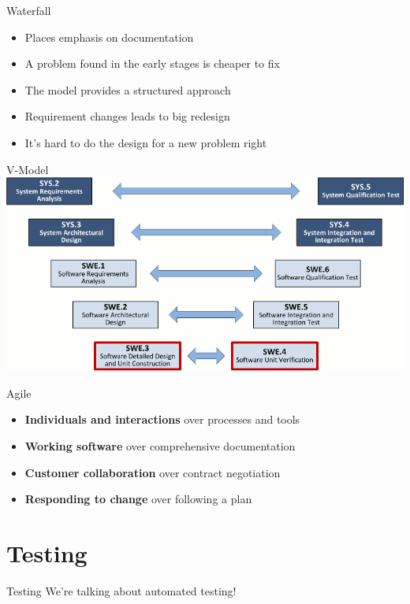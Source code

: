 \documentclass{beamer}
\begin{document}
\begin{frame}{Waterfall}
\begin{itemize}
  \item Places emphasis on documentation
  \item A problem found in the early stages is cheaper to fix
  \item The model provides a structured approach
  \item Requirement changes leads to big redesign
  \item It's hard to do the design for a new problem right
\end{itemize}
\end{frame}

\begin{frame}{V-Model}
\includegraphics[scale=0.4]{img/VModel.png}
\end{frame}

\begin{frame}{Agile}
\begin{itemize}
  \item \textbf{Individuals and interactions} over processes and tools 
  \item \textbf{Working software} over comprehensive documentation
  \item \textbf{Customer collaboration} over contract negotiation
  \item \textbf{Responding to change} over following a plan
\end{itemize}
\end{frame}

\section{Testing}
\begin{frame}{Testing}
We're talking about automated testing!
\end{frame}
\end{document}
